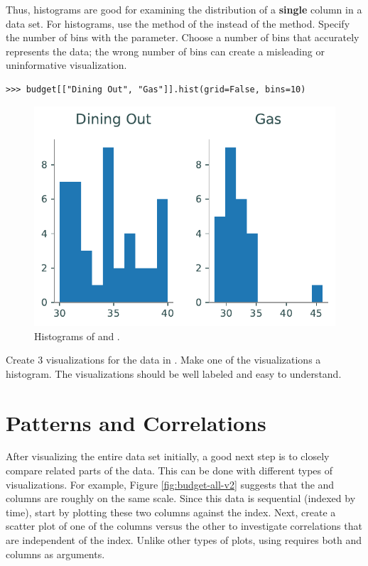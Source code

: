 Thus, histograms are good for examining the distribution of a \textbf{single} column in a data set.
For histograms, use the  method of the  instead of the  method.
Specify the number of bins with the  parameter.
Choose a number of bins that accurately represents the data; the wrong number of bins can create a misleading or uninformative visualization.


\begin{lstlisting}
>>> budget[["Dining Out", "Gas"]].hist(grid=False, bins=10)
\end{lstlisting}

\begin{figure}[H]
    \includegraphics[width=.7\textwidth]{figures/hist_subplots.pdf}
   \caption{Histograms of  and .}
\end{figure}

\begin{problem}
Create 3 visualizations for the data in .
Make one of the visualizations a histogram.
The visualizations should be well labeled and easy to understand.
\label{prob:hist}
\end{problem}

\section*{Patterns and Correlations} %

After visualizing the entire data set initially, a good next step is to closely compare related parts of the data.
This can be done with different types of visualizations.
For example, Figure \ref{fig:budget-all-v2} suggests that the  and  columns are roughly on the same scale.
Since this data is sequential (indexed by time), start by plotting these two columns against the index.
Next, create a scatter plot of one of the columns versus the other to investigate correlations that are independent of the index.
Unlike other types of plots, using  requires both  and  columns as arguments.

